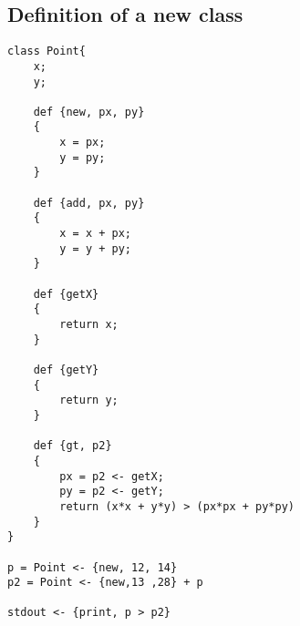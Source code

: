 \documentclass{eplDoc}
\begin{document}
\subsection{Definition of a new class}
\begin{lstlisting}
class Point{
    x;
    y;

    def {new, px, py}
    {
        x = px;
        y = py;
    }

    def {add, px, py}
    {
        x = x + px;
        y = y + py;
    }

    def {getX}
    {
        return x;    
    }
    
    def {getY}
    {
        return y;    
    }

    def {gt, p2}
    {
        px = p2 <- getX;    
        py = p2 <- getY;    
        return (x*x + y*y) > (px*px + py*py)
    }
}

p = Point <- {new, 12, 14}
p2 = Point <- {new,13 ,28} + p

stdout <- {print, p > p2}

\end{lstlisting}

\subsection{}
\end{document}
